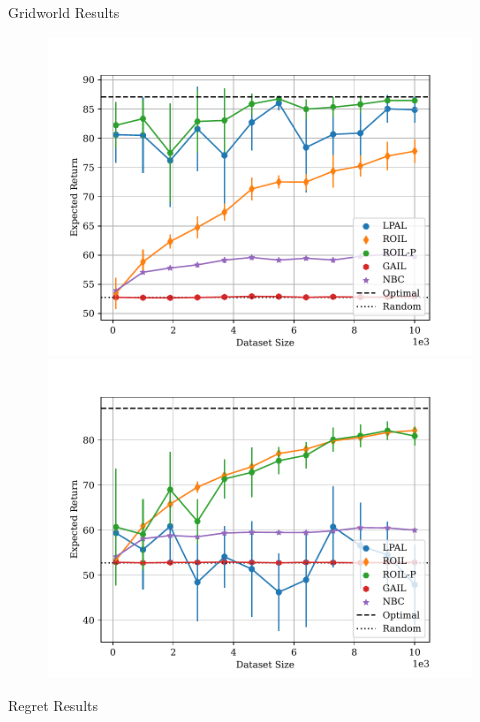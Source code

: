 \documentclass[final,a0paper]{beamer}
\begin{document}
\begin{frame}{}
\begin{columns}[t]
  \begin{column}{0.3\linewidth}
    \begin{block}{Gridworld Results}
        \begin{center}
            \begin{figure}
                \includegraphics[]{../../pres_roil/plots/returns/40x40_gridworld_on_policy_returns.pdf}
                \includegraphics[]{../../pres_roil/plots/returns/40x40_gridworld_off_policy_returns.pdf}
            \end{figure}
        \end{center}
    \end{block}
    \begin{block}{Regret Results}

\end{block}
\end{column}
\end{columns}
\end{frame}
\end{document}
